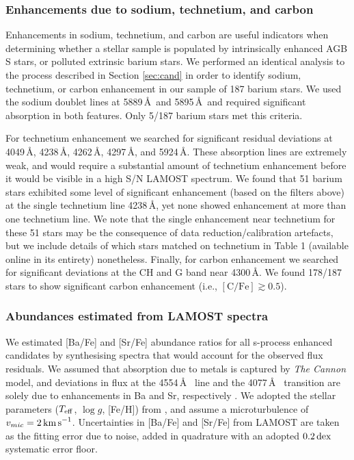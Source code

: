 \documentclass[a4paper,fleqn,usenatbib]{mnras}
\begin{document}
\subsubsection{Enhancements due to sodium, technetium, and carbon} \label{sec:other enhancements}
Enhancements in sodium, technetium, and carbon are useful indicators when determining whether a stellar sample is populated by intrinsically enhanced AGB S stars, or polluted extrinsic barium stars. We performed an identical analysis to the process described in Section \ref{sec:cand} in order to identify sodium, technetium, or carbon enhancement in our sample of 187 barium stars. We used the sodium doublet lines at 5889\,\AA\ and 5895\,\AA\, and required significant absorption in both features. Only 5/187 barium stars met this criteria.

For technetium enhancement we searched for significant residual deviations at 4049\,\AA, 4238\,\AA, 4262\,\AA, 4297\,\AA, and 5924\,\AA. These absorption lines are extremely weak, and would require a substantial amount of technetium enhancement before it would be visible in a high S/N LAMOST spectrum. We found that 51 barium stars exhibited some level of significant enhancement (based on the filters above) at the single technetium line 4238\,\AA, yet none showed enhancement at more than one technetium line. We note that the single enhancement near technetium for these 51 stars may be the consequence of data reduction/calibration artefacts, but we include details of which stars matched on technetium in Table 1 (available online in its entirety) nonetheless.
Finally, for carbon enhancement we searched for significant deviations at the CH and G band near 4300\,\AA. We found 178/187 stars to show significant carbon enhancement (i.e., $[\textrm{C/Fe}] \gtrsim 0.5$). 



\subsubsection{Abundances estimated from LAMOST spectra}
We estimated [Ba/Fe] and [Sr/Fe] abundance ratios for all s-process enhanced candidates by synthesising spectra that would account for the observed flux residuals. We assumed that absorption due to metals is captured by \emph{The Cannon} model, and deviations in flux at the 4554\,\AA\  line and the 4077\,\AA\  transition are solely due to enhancements in Ba and Sr, respectively \citep{marcs,sme,vald,ispec}. We adopted the stellar parameters ($T_{\rm eff}$, $\log{g}$, [Fe/H]) from \citet{ho2017}, and assume a microturbulence of $v_{mic} = 2\,{\rm km\,s}^{-1}$. Uncertainties in [Ba/Fe] and [Sr/Fe] from LAMOST are taken as the fitting error due to noise, added in quadrature with an adopted $0.2\,{\rm dex}$ systematic error floor.
\end{document}
